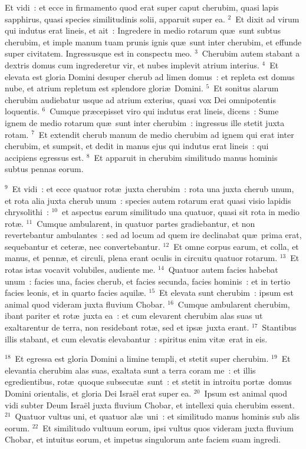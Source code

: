 \lettrine[lines=10,image=true,loversize=0.05,lraise=-0.03]{E}{}t vidi~: et ecce in firmamento quod erat super caput cherubim, quasi lapis sapphirus, quasi species similitudinis solii, apparuit super ea.
${}^{2}$~Et dixit ad virum qui indutus erat lineis, et ait~: Ingredere in medio rotarum qu\ae\ sunt subtus cherubim, et imple manum tuam prunis ignis qu\ae\ sunt inter cherubim, et effunde super civitatem. Ingressusque est in conspectu meo.
${}^{3}$~Cherubim autem stabant a dextris domus cum ingrederetur vir, et nubes implevit atrium interius.
${}^{4}$~Et elevata est gloria Domini desuper cherub ad limen domus~: et repleta est domus nube, et atrium repletum est splendore glori\ae\ Domini.
${}^{5}$~Et sonitus alarum cherubim audiebatur usque ad atrium exterius, quasi vox Dei omnipotentis loquentis.
${}^{6}$~Cumque pr\ae cepisset viro qui indutus erat lineis, dicens~: Sume ignem de medio rotarum qu\ae\ sunt inter cherubim~: ingressus ille stetit juxta rotam.
${}^{7}$~Et extendit cherub manum de medio cherubim ad ignem qui erat inter cherubim, et sumpsit, et dedit in manus ejus qui indutus erat lineis~: qui accipiens egressus est.
${}^{8}$~Et apparuit in cherubim similitudo manus hominis subtus pennas eorum.


${}^{9}$~Et vidi~: et ecce quatuor rot\ae\ juxta cherubim~: rota una juxta cherub unum, et rota alia juxta cherub unum~: species autem rotarum erat quasi visio lapidis chrysolithi~:
${}^{10}$~et aspectus earum similitudo una quatuor, quasi sit rota in medio rot\ae .
${}^{11}$~Cumque ambularent, in quatuor partes gradiebantur, et non revertebantur ambulantes~: sed ad locum ad quem ire declinabat qu\ae\ prima erat, sequebantur et ceter\ae , nec convertebantur.
${}^{12}$~Et omne corpus earum, et colla, et manus, et penn\ae , et circuli, plena erant oculis in circuitu quatuor rotarum.
${}^{13}$~Et rotas istas vocavit volubiles, audiente me.
${}^{14}$~Quatuor autem facies habebat unum~: facies una, facies cherub, et facies secunda, facies hominis~: et in tertio facies leonis, et in quarto facies aquil\ae .
${}^{15}$~Et elevata sunt cherubim~: ipsum est animal quod videram juxta fluvium Chobar.
${}^{16}$~Cumque ambularent cherubim, ibant pariter et rot\ae\ juxta ea~: et cum elevarent cherubim alas suas ut exaltarentur de terra, non residebant rot\ae , sed et ips\ae\ juxta erant.
${}^{17}$~Stantibus illis stabant, et cum elevatis elevabantur~: spiritus enim vit\ae\ erat in eis.


${}^{18}$~Et egressa est gloria Domini a limine templi, et stetit super cherubim.
${}^{19}$~Et elevantia cherubim alas suas, exaltata sunt a terra coram me~: et illis egredientibus, rot\ae\ quoque subsecut\ae\ sunt~: et stetit in introitu port\ae\ domus Domini orientalis, et gloria Dei Isra\"el erat super ea.
${}^{20}$~Ipsum est animal quod vidi subter Deum Isra\"el juxta fluvium Chobar, et intellexi quia cherubim essent.
${}^{21}$~Quatuor vultus uni, et quatuor al\ae\ uni~: et similitudo manus hominis sub alis eorum.
${}^{22}$~Et similitudo vultuum eorum, ipsi vultus quos videram juxta fluvium Chobar, et intuitus eorum, et impetus singulorum ante faciem suam ingredi.


